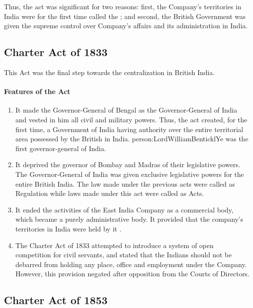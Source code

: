 Thus, the act was significant for two reasons: first, the Company's territories in India were for the first time called the ; and second, the British Government was given the supreme control over Company's affairs and its administration in India.

\subsection{Charter Act of 1833}

This Act was the final step towards the centralization in British India.

\paragraph{Features of the Act}
\begin{enumerate}
  \item It made the Governor-General of Bengal as the Governor-General of India and vested in him all civil and military powers. Thus, the act created, for the first time, a Government of India having authority over the entire territorial area possessed by the British in India. \gls{person:LordWilliamBenticklYe} was the first governor-general of India.
  \item It deprived the governor of Bombay and Madras of their legislative powers. The Governor-General of India was given exclusive legislative powers for the entire British India. The law made under the previous acts were called as Regulation while laws made under this act were called as Acts.
  \item It ended the activities of the East India Company as a commercial body, which became a purely administrative body. It provided that the company's territories in India were held by it .
  \item The Charter Act of 1833 attempted to introduce a system of open competition for civil servants, and stated that the Indians should not be debarred from holding any place, office and employment under the Company. However, this provision negated after opposition from the Courts of Directors.
\end{enumerate}

\subsection{Charter Act of 1853}

